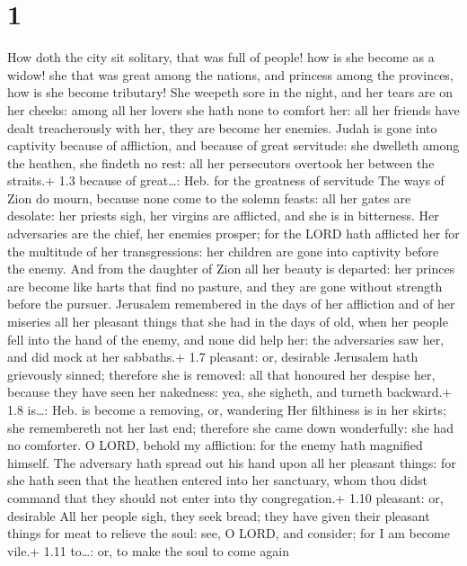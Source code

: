 \hypertarget{section}{%
\section{1}\label{section}}

 How doth the city sit solitary, that was full of people!
how is she become as a widow! she that was great among the nations, and
princess among the provinces, how is she become tributary! 
She weepeth sore in the night, and her tears are on her cheeks: among
all her lovers she hath none to comfort her: all her friends have dealt
treacherously with her, they are become her enemies.  Judah
is gone into captivity because of affliction, and because of great
servitude: she dwelleth among the heathen, she findeth no rest: all her
persecutors overtook her between the straits.+ 1.3 because of
great\ldots: Heb. for the greatness of servitude  The ways
of Zion do mourn, because none come to the solemn feasts: all her gates
are desolate: her priests sigh, her virgins are afflicted, and she is in
bitterness.  Her adversaries are the chief, her enemies
prosper; for the LORD hath afflicted her for the multitude of her
transgressions: her children are gone into captivity before the enemy.
 And from the daughter of Zion all her beauty is departed:
her princes are become like harts that find no pasture, and they are
gone without strength before the pursuer.  Jerusalem
remembered in the days of her affliction and of her miseries all her
pleasant things that she had in the days of old, when her people fell
into the hand of the enemy, and none did help her: the adversaries saw
her, and did mock at her sabbaths.+ 1.7 pleasant: or, desirable
 Jerusalem hath grievously sinned; therefore she is removed:
all that honoured her despise her, because they have seen her nakedness:
yea, she sigheth, and turneth backward.+ 1.8 is\ldots: Heb. is become a
removing, or, wandering  Her filthiness is in her skirts;
she remembereth not her last end; therefore she came down wonderfully:
she had no comforter. O LORD, behold my affliction: for the enemy hath
magnified himself.  The adversary hath spread out his hand
upon all her pleasant things: for she hath seen that the heathen entered
into her sanctuary, whom thou didst command that they should not enter
into thy congregation.+ 1.10 pleasant: or, desirable  All
her people sigh, they seek bread; they have given their pleasant things
for meat to relieve the soul: see, O LORD, and consider; for I am become
vile.+ 1.11 to\ldots: or, to make the soul to come again

